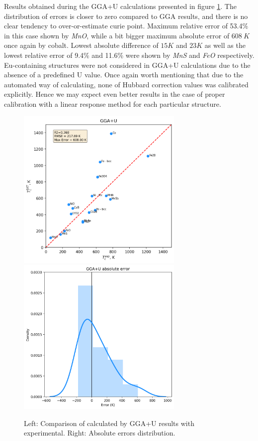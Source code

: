 Results obtained during the GGA+U calculations presented in figure \ref{fig:gga_u}.  The distribution of errors is closer to zero compared to GGA results, and there is no clear tendency to over-or-estimate curie point.  Maximum relative error of 53.4\% in this case shown by \textit{MnO}, while a bit bigger maximum absolute error of $608\ K$ once again by cobalt.  Lowest absolute difference of $15K$ and $23K$ as well as the lowest relative error of 9.4\% and 11.6\% were shown by \textit{MnS} and \textit{FeO} respectively.  Eu-containing structures were not considered in GGA+U calculations due to the absence of a predefined U value. Once again worth mentioning that due to the automated way of calculating, none of Hubbard correction values was calibrated explicitly. Hence we may expect even better results in the case of proper calibration with a linear response method for each particular structure.

\begin{figure}[H]
\centering
\captionsetup{justification=centering,margin=2cm}
	\includegraphics[width=80mm]{fig/dft_fig/gga_u_results.png}\includegraphics[width=80mm]{fig/dft_fig/gga_u_err.png}
	\caption[Comparison of calculated by GGA+U results with experimental.]{Left: Comparison of calculated by GGA+U results with experimental. Right: Absolute errors distribution.}
\label{fig:gga_u}
\end{figure}


